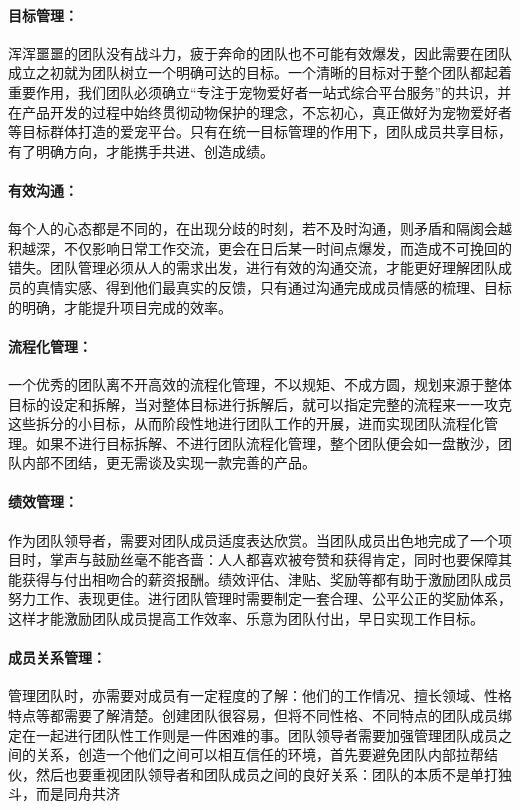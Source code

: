 \documentclass[a4paper]{ctexart}
\begin{document}
\paragraph{目标管理：}浑浑噩噩的团队没有战斗力，疲于奔命的团队也不可能有效爆发，因此需要在团队成立之初就为团队树立一个明确可达的目标。一个清晰的目标对于整个团队都起着重要作用，我们团队必须确立“专注于宠物爱好者一站式综合平台服务”的共识，并在产品开发的过程中始终贯彻动物保护的理念，不忘初心，真正做好为宠物爱好者等目标群体打造的爱宠平台。只有在统一目标管理的作用下，团队成员共享目标，有了明确方向，才能携手共进、创造成绩。
\paragraph{有效沟通：}每个人的心态都是不同的，在出现分歧的时刻，若不及时沟通，则矛盾和隔阂会越积越深，不仅影响日常工作交流，更会在日后某一时间点爆发，而造成不可挽回的错失。团队管理必须从人的需求出发，进行有效的沟通交流，才能更好理解团队成员的真情实感、得到他们最真实的反馈，只有通过沟通完成成员情感的梳理、目标的明确，才能提升项目完成的效率。
\paragraph{流程化管理：}一个优秀的团队离不开高效的流程化管理，不以规矩、不成方圆，规划来源于整体目标的设定和拆解，当对整体目标进行拆解后，就可以指定完整的流程来一一攻克这些拆分的小目标，从而阶段性地进行团队工作的开展，进而实现团队流程化管理。如果不进行目标拆解、不进行团队流程化管理，整个团队便会如一盘散沙，团队内部不团结，更无需谈及实现一款完善的产品。
\paragraph{绩效管理：}作为团队领导者，需要对团队成员适度表达欣赏。当团队成员出色地完成了一个项目时，掌声与鼓励丝毫不能吝啬：人人都喜欢被夸赞和获得肯定，同时也要保障其能获得与付出相吻合的薪资报酬。绩效评估、津贴、奖励等都有助于激励团队成员努力工作、表现更佳。进行团队管理时需要制定一套合理、公平公正的奖励体系，这样才能激励团队成员提高工作效率、乐意为团队付出，早日实现工作目标。
\paragraph{成员关系管理：}管理团队时，亦需要对成员有一定程度的了解：他们的工作情况、擅长领域、性格特点等都需要了解清楚。创建团队很容易，但将不同性格、不同特点的团队成员绑定在一起进行团队性工作则是一件困难的事。团队领导者需要加强管理团队成员之间的关系，创造一个他们之间可以相互信任的环境，首先要避免团队内部拉帮结伙，然后也要重视团队领导者和团队成员之间的良好关系：团队的本质不是单打独斗，而是同舟共济
\end{document}
